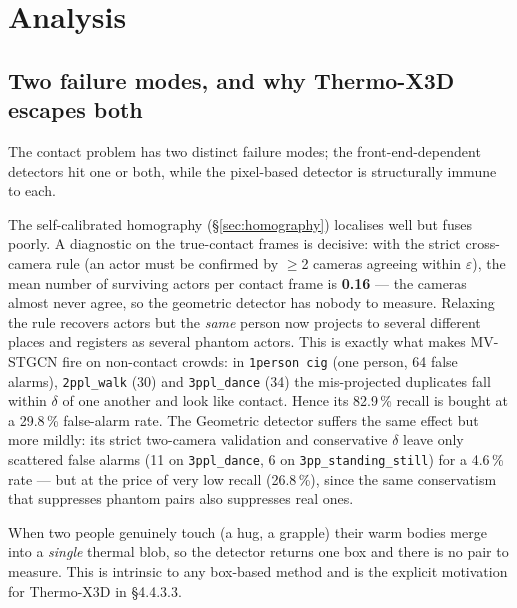 \documentclass[11pt, a4paper]{article}
\begin{document}
\section{Analysis}
\label{sec:analysis}

\subsection{Two failure modes, and why Thermo-X3D escapes both}

The contact problem has two distinct failure modes; the front-end-dependent
detectors hit one or both, while the pixel-based detector is structurally immune
to each.

\begin{description}[leftmargin=2em, style=nextline]
    \item[Failure mode \#1 — homography noise.] The self-calibrated homography
        (\S\ref{sec:homography}) localises well but fuses poorly. A diagnostic on
        the true-contact frames is decisive: with the strict cross-camera rule
        (an actor must be confirmed by $\ge$2 cameras agreeing within
        $\varepsilon$), the mean number of surviving actors per contact frame is
        \textbf{0.16} --- the cameras almost never agree, so the geometric
        detector has nobody to measure. Relaxing the rule recovers actors but
        the \emph{same} person now projects to several different places and
        registers as several phantom actors. This is exactly what makes MV-STGCN
        fire on non-contact crowds: in \texttt{1person cig} (one person, 64 false
        alarms), \texttt{2ppl\_walk} (30) and \texttt{3ppl\_dance} (34) the
        mis-projected duplicates fall within $\delta$ of one another and look
        like contact. Hence its 82.9\,\% recall is bought at a 29.8\,\%
        false-alarm rate. The Geometric detector suffers the same effect but
        more mildly: its strict two-camera validation and conservative $\delta$
        leave only scattered false alarms (11 on \texttt{3ppl\_dance}, 6 on
        \texttt{3pp\_standing\_still}) for a 4.6\,\% rate --- but at the price of
        very low recall (26.8\,\%), since the same conservatism that suppresses
        phantom pairs also suppresses real ones.
    \item[Failure mode \#2 — blob merge at contact.] When two people genuinely
        touch (a hug, a grapple) their warm bodies merge into a \emph{single}
        thermal blob, so the detector returns one box and there is no pair to
        measure. This is intrinsic to any box-based method and is the explicit
        motivation for Thermo-X3D in \S4.4.3.3.
\end{description}
\end{document}
